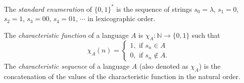 \documentclass[12pt]{article}
\begin{document}

The \emph{standard enumeration} of $\lbrace 0,1\rbrace ^{*}$ is the sequence of strings $s_0 =\lambda$, $s_1 = 0$, $s_2 = 1$, $s_3 = 00$, $s_4 = 01$, $\cdots$ in lexicographic order.

The \emph{characteristic function} of a language $A$ is $\chi_{A}:\mathbb{N}\rightarrow \lbrace 0, 1\rbrace$ such that 
\[\chi_{A}(n)=\begin{cases}
1,\text{ if }s_n \in A\\
0,\text{ if }s_n \notin A.
\end{cases}\]
The \emph{characteristic sequence} of a language $A$ (also denoted as $\chi_A$) is the concatenation of the values of the characteristic function in the natural order.
\end{document}
